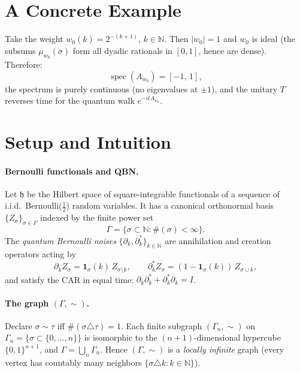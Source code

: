 \documentclass[11pt,a4paper]{article}
\begin{document}
\section{A Concrete Example}

Take the weight $w_0(k)=2^{-(k+1)}$, $k\in\mathbb{N}$. Then $|w_0|=1$ and $w_0$ is ideal (the subsums $\mu_{w_0}(\sigma)$ form all dyadic rationals in $[0,1]$, hence are dense). Therefore:
\[
  \operatorname{spec}(A_{w_0}) = [-1,\,1],
\]
the spectrum is purely continuous (no eigenvalues at $\pm 1$), and the unitary $T$ reverses time for the quantum walk $e^{-itA_{w_0}}$.

\section{Setup and Intuition}

\paragraph{Bernoulli functionals and QBN.}
Let $\mathfrak{h}$ be the Hilbert space of square-integrable functionals of a sequence of i.i.d.\ Bernoulli($\tfrac12$) random variables. It has a canonical orthonormal basis $\{Z_\sigma\}_{\sigma\in\Gamma}$ indexed by the finite power set
\[
  \Gamma = \{\sigma\subset\mathbb{N} : \#(\sigma)<\infty\}.
\]
The \emph{quantum Bernoulli noises} $\{\partial_k,\partial_k^*\}_{k\in\mathbb{N}}$ are annihilation and creation operators acting by
\[
  \partial_k Z_\sigma = \mathbf{1}_\sigma(k)\,Z_{\sigma\setminus k}, \qquad
  \partial_k^* Z_\sigma = (1-\mathbf{1}_\sigma(k))\,Z_{\sigma\cup k},
\]
and satisfy the CAR in equal time: $\partial_k\partial_k^*+\partial_k^*\partial_k = I$.

\paragraph{The graph $(\Gamma,\sim)$.}
Declare $\sigma\sim\tau$ iff $\#(\sigma\triangle\tau)=1$. Each finite subgraph $(\Gamma_n,\sim)$ on $\Gamma_n=\{\sigma\subset\{0,\dots,n\}\}$ is isomorphic to the $(n{+}1)$-dimensional hypercube $\{0,1\}^{n+1}$, and $\Gamma=\bigcup_n\Gamma_n$. Hence $(\Gamma,\sim)$ is a \emph{locally infinite} graph (every vertex has countably many neighbors $\{\sigma\triangle k : k\in\mathbb{N}\}$).
\end{document}
